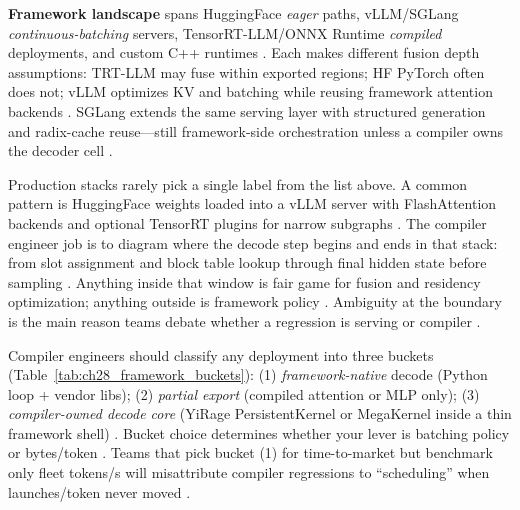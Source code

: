 \textbf{Framework landscape} spans HuggingFace \emph{eager} paths, vLLM/SGLang \emph{continuous-batching} servers, TensorRT-LLM/ONNX Runtime \emph{compiled} deployments, and custom C++ runtimes \citep{kwon2023vllm,patel2025llminference,dlbook,chen2020compilerbasedhardw,yirage2026}. Each makes different fusion depth assumptions: TRT-LLM may fuse within exported regions; HF PyTorch often does not; vLLM optimizes KV and batching while reusing framework attention backends \citep{patel2025llminference,dao2022flashattention,dao2023flashdecoding,memoryfloor2026,taxbreak2026}. SGLang extends the same serving layer with structured generation and radix-cache reuse---still framework-side orchestration unless a compiler owns the decoder cell \citep{patel2025llminference,kwon2023vllm,yirage2026}.

Production stacks rarely pick a single label from the list above. A common pattern is HuggingFace weights loaded into a vLLM server with FlashAttention backends and optional TensorRT plugins for narrow subgraphs \citep{kwon2023vllm,patel2025llminference,dao2022flashattention,dao2023flashdecoding,taxbreak2026,memoryfloor2026,yirage2026,chen2020compilerbasedhardw,dlbook}. The compiler engineer job is to diagram where the decode step begins and ends in that stack: from slot assignment and block table lookup through final hidden state before sampling \citep{kwon2023vllm,yirage2026,chen2020compilerbasedhardw,patel2025llminference,memoryfloor2026,taxbreak2026,dao2022flashattention,dlbook}. Anything inside that window is fair game for fusion and residency optimization; anything outside is framework policy \citep{patel2025llminference,yirage2026,chen2020compilerbasedhardw,kwon2023vllm,taxbreak2026,memoryfloor2026,dlbook}. Ambiguity at the boundary is the main reason teams debate whether a regression is serving or compiler \citep{taxbreak2026,memoryfloor2026,patel2025llminference,yirage2026,chen2020compilerbasedhardw,kwon2023vllm,dlbook}.

Compiler engineers should classify any deployment into three buckets (Table~\ref{tab:ch28_framework_buckets}): (1) \emph{framework-native} decode (Python loop + vendor libs); (2) \emph{partial export} (compiled attention or MLP only); (3) \emph{compiler-owned decode core} (YiRage PersistentKernel or MegaKernel inside a thin framework shell) \citep{yirage2026,chen2020compilerbasedhardw,nvidia2024cudagraphs,liu2024deepseekv3,kwon2023vllm,patel2025llminference,taxbreak2026,memoryfloor2026,dlbook}. Bucket choice determines whether your lever is batching policy or bytes/token \citep{patel2025llminference,taxbreak2026,memoryfloor2026,yirage2026}. Teams that pick bucket (1) for time-to-market but benchmark only fleet tokens/s will misattribute compiler regressions to ``scheduling'' when launches/token never moved \citep{taxbreak2026,memoryfloor2026,patel2025llminference}.

